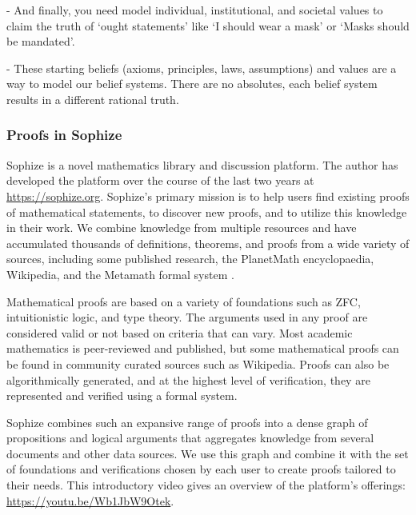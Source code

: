 \documentclass[a4paper]{article}
\begin{document}
- And finally, you need model individual, institutional, and societal values to claim the truth of `ought statements' like `I should wear a mask' or `Masks should be mandated'.

- These starting beliefs (axioms, principles, laws, assumptions) and values are a way to model our belief systems. There are no absolutes, each belief system results in a different rational truth.



\subsubsection*{Proofs in Sophize}
Sophize is a novel mathematics library and discussion platform. The author has developed the platform over the course of the last two years at \url{https://sophize.org}. Sophize's primary mission is to help users find existing proofs of mathematical statements, to discover new proofs, and to utilize this knowledge in their work. We combine knowledge from multiple resources and have accumulated thousands of definitions, theorems, and proofs from a wide variety of sources, including some published research, the PlanetMath encyclopaedia, Wikipedia, and the Metamath formal system \cite{metamath}.


Mathematical proofs are based on a variety of foundations such as ZFC, intuitionistic logic, and type theory. The arguments used in any proof are considered valid or not based on criteria that can vary. Most academic mathematics is peer-reviewed and published, but some mathematical proofs can be found in community curated sources such as Wikipedia. Proofs can also be algorithmically generated, and at the highest level of verification, they are represented and verified using a formal system. 

Sophize combines such an expansive range of proofs into a dense graph of propositions and logical arguments that aggregates knowledge from several documents and other data sources. We use this graph and combine it with the set of foundations and verifications chosen by each user to create proofs tailored to their needs. This introductory video gives an overview of the platform's offerings: \url{https://youtu.be/Wb1JbW9Otek}.
\end{document}
